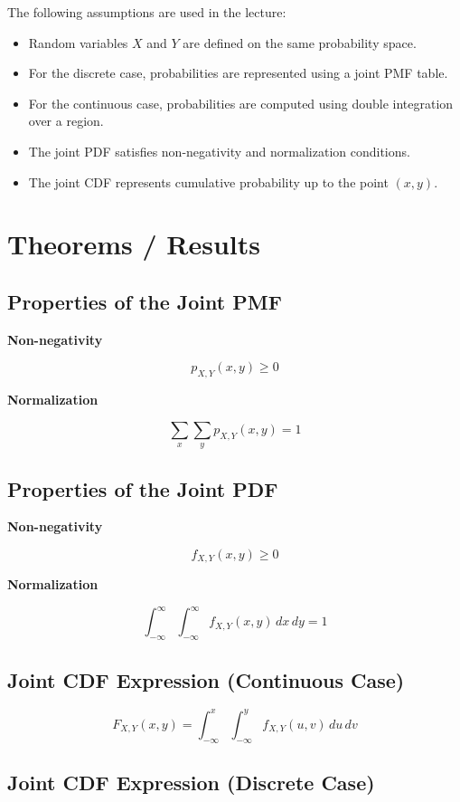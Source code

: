 \documentclass[12pt]{article}
\begin{document}
The following assumptions are used in the lecture:

\begin{itemize}
\item Random variables $X$ and $Y$ are defined on the same probability space.
\item For the discrete case, probabilities are represented using a joint PMF table.
\item For the continuous case, probabilities are computed using double integration over a region.
\item The joint PDF satisfies non-negativity and normalization conditions.
\item The joint CDF represents cumulative probability up to the point $(x,y)$.
\end{itemize}

\section{Theorems / Results}

\subsection{Properties of the Joint PMF}

\textbf{Non-negativity}

\[
p_{X,Y}(x,y) \ge 0
\]

\textbf{Normalization}

\[
\sum_x \sum_y p_{X,Y}(x,y) = 1
\]

\subsection{Properties of the Joint PDF}

\textbf{Non-negativity}

\[
f_{X,Y}(x,y) \ge 0
\]

\textbf{Normalization}

\[
\int_{-\infty}^{\infty}\int_{-\infty}^{\infty} f_{X,Y}(x,y)\, dx\, dy = 1
\]

\subsection{Joint CDF Expression (Continuous Case)}

\[
F_{X,Y}(x,y) =
\int_{-\infty}^{x}\int_{-\infty}^{y}
f_{X,Y}(u,v)\, du\, dv
\]

\subsection{Joint CDF Expression (Discrete Case)}
\end{document}
